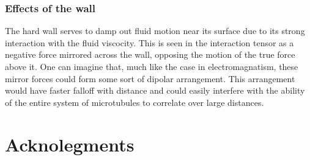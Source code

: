 \documentclass[11pt]{ucthesis}
\begin{document}
\section{Effects of the wall}
The hard wall serves to damp out fluid motion near its surface due to its strong interaction with the fluid viscocity. 
This is seen in the interaction tensor as a negative force mirrored across the wall, opposing the motion of the true force above it.
One can imagine that, much like the case in electromagnatism, these mirror forces could form some sort of dipolar arrangement. 
This arrangement would have faster falloff with distance and could easily interfere with the ability of the entire system of microtubules to correlate over large distances.

\part{Acknolegments}
\end{document}
